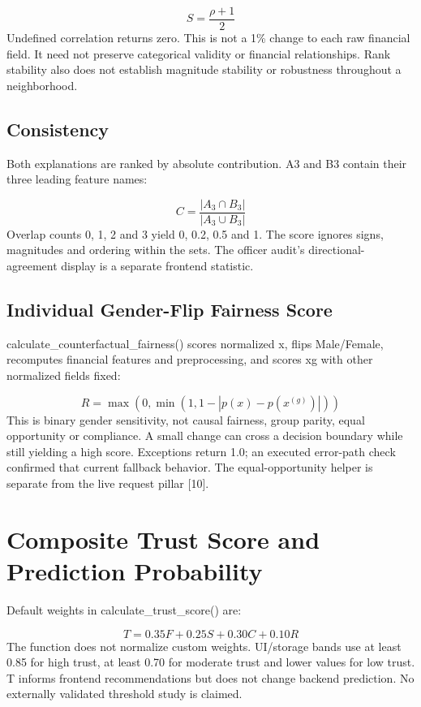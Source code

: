 \documentclass[12pt,a4paper]{report}
\begin{document}
\begin{equation}S=\frac{\rho+1}{2}\end{equation}
Undefined correlation returns zero. This is not a 1\% change to each raw financial field. It need not preserve categorical validity or financial relationships. Rank stability also does not establish magnitude stability or robustness throughout a neighborhood.

\subsection{Consistency}
Both explanations are ranked by absolute contribution. A3 and B3 contain their three leading feature names:

\begin{equation}C=\frac{|A_3\cap B_3|}{|A_3\cup B_3|}\end{equation}
Overlap counts 0, 1, 2 and 3 yield 0, 0.2, 0.5 and 1. The score ignores signs, magnitudes and ordering within the sets. The officer audit's directional-agreement display is a separate frontend statistic.

\subsection{Individual Gender-Flip Fairness Score}
calculate\_counterfactual\_fairness() scores normalized x, flips Male/Female, recomputes financial features and preprocessing, and scores xg with other normalized fields fixed:

\begin{equation}R=\max(0,\min(1,1-|p(x)-p(x^{(g)})|))\end{equation}
This is binary gender sensitivity, not causal fairness, group parity, equal opportunity or compliance. A small change can cross a decision boundary while still yielding a high score. Exceptions return 1.0; an executed error-path check confirmed that current fallback behavior. The equal-opportunity helper is separate from the live request pillar [10].

\section{Composite Trust Score and Prediction Probability}
Default weights in calculate\_trust\_score() are:

\begin{equation}T=0.35F+0.25S+0.30C+0.10R\end{equation}
The function does not normalize custom weights. UI/storage bands use at least 0.85 for high trust, at least 0.70 for moderate trust and lower values for low trust. T informs frontend recommendations but does not change backend prediction. No externally validated threshold study is claimed.
\end{document}
